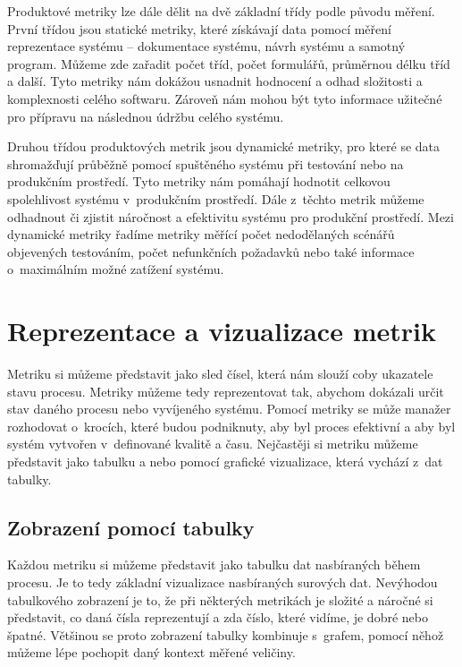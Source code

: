 \documentclass[czech,master]{diploma}
\begin{document}
Produktové metriky lze dále dělit na dvě základní třídy podle původu měření. První třídou jsou statické metriky, které získávají data pomocí měření reprezentace systému -- dokumentace systému, návrh systému a samotný program. Můžeme zde zařadit počet tříd, počet formulářů, průměrnou délku tříd a další. Tyto metriky nám dokážou usnadnit hodnocení a odhad složitosti a komplexnosti celého softwaru. Zároveň nám mohou být tyto informace užitečné pro přípravu na následnou údržbu celého systému.

Druhou třídou produktových metrik jsou dynamické metriky, pro které se data shromažďují průběžně pomocí spuštěného systému při testování nebo na produkčním prostředí. Tyto metriky nám pomáhají hodnotit celkovou spolehlivost systému v~produkčním prostředí. Dále z~těchto metrik můžeme odhadnout či zjistit náročnost a efektivitu systému pro produkční prostředí. Mezi dynamické metriky řadíme metriky měřící počet nedodělaných scénářů objevených testováním, počet nefunkčních požadavků nebo také informace o~maximálním možné zatížení systému.

\section{Reprezentace a vizualizace metrik}
\label{sec:visualisation}
Metriku si můžeme představit jako sled čísel, která nám slouží coby ukazatele stavu procesu. Metriky můžeme tedy reprezentovat tak, abychom dokázali určit stav daného procesu nebo vyvíjeného systému. Pomocí metriky se může manažer rozhodovat o~krocích, které budou podniknuty, aby byl proces efektivní a aby byl systém vytvořen v~definované kvalitě a času. Nejčastěji si metriku můžeme představit jako tabulku a nebo pomocí grafické vizualizace, která vychází z~dat tabulky.


\subsection{Zobrazení pomocí tabulky}
Každou metriku si můžeme představit jako tabulku dat nasbíraných během procesu. Je to tedy základní vizualizace nasbíraných surových dat. Nevýhodou tabulkového zobrazení je to, že při některých metrikách je složité a náročné si představit, co daná čísla reprezentují a zda číslo, které vidíme, je dobré nebo špatné. Většinou se proto zobrazení tabulky kombinuje s~grafem, pomocí něhož můžeme lépe pochopit daný kontext měřené veličiny.
\end{document}
